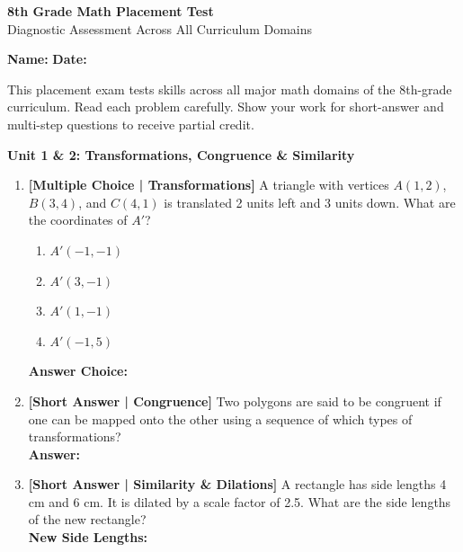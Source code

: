\documentclass[12pt, letterpaper, fleqn]{article}
\newcommand{\blankshorter}{\underline{\hspace{2.0cm}}}
\newcommand{\blanklong}{\underline{\hspace{6.5cm}}}
\begin{document}
\begin{center}
    {\LARGE \textbf{8th Grade Math Placement Test}}\\[4pt]
    {\large Diagnostic Assessment Across All Curriculum Domains}
\end{center}

\vspace{4mm}
\textbf{Name:} \underline{\hspace{6cm}}
\hfill
\textbf{Date:} \underline{\hspace{4cm}}\\
\vspace{2mm}

\begin{tcolorbox}[colback=black!5, colframe=black!40, arc=2mm, title=\textbf{Instructions for Students}]
This placement exam tests skills across all major math domains of the 8th-grade curriculum. Read each problem carefully. Show your work for short-answer and multi-step questions to receive partial credit.
\end{tcolorbox}

\vspace{4mm}

\begin{tcolorbox}[colback=white, colframe=black, arc=2mm]
    \textbf{Unit 1 \& 2: Transformations, Congruence \& Similarity}
\end{tcolorbox}

\begin{enumerate}[leftmargin=0.6cm, itemsep=\fill]

\item \textbf{[Multiple Choice | Transformations]} A triangle with vertices $A(1, 2)$, $B(3, 4)$, and $C(4, 1)$ is translated 2 units left and 3 units down. What are the coordinates of $A'$?
\begin{enumerate}[label=\Alph*)]
    \item $A'(-1, -1)$
    \item $A'(3, -1)$
    \item $A'(1, -1)$
    \item $A'(-1, 5)$
\end{enumerate}
\textbf{Answer Choice:} \blankshorter

\item \textbf{[Short Answer | Congruence]} Two polygons are said to be congruent if one can be mapped onto the other using a sequence of which types of transformations?
\vspace{1.5cm} \\
\textbf{Answer:} \blanklong

\item \textbf{[Short Answer | Similarity \& Dilations]} A rectangle has side lengths 4 cm and 6 cm. It is dilated by a scale factor of 2.5. What are the side lengths of the new rectangle?
\vspace{1.5cm} \\
\textbf{New Side Lengths:} \blanklong

\end{enumerate}
\vspace{0.5cm}
\end{document}
